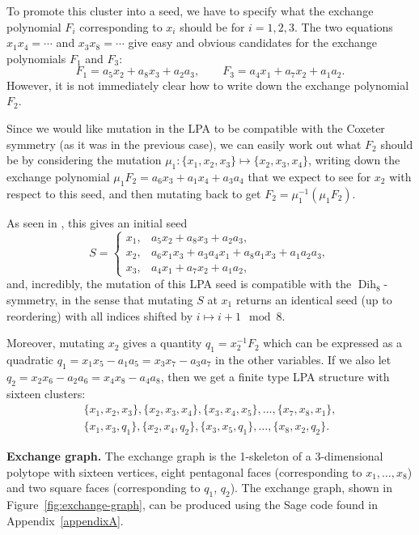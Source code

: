 \documentclass[pdftex]{sigma}
\numberwithin{equation}{section}
\theoremstyle{definition}
\DeclareMathOperator{\Dih}{Dih}
\begin{document}
To promote this cluster into a seed, we have to specify what the exchange polynomial $F_i$ corresponding to $x_i$ should be for $i=1,2,3$. The two equations $x_1x_4=\cdots$ and $x_3x_8=\cdots$ give easy and obvious candidates for the exchange polynomials $F_1$ and $F_3$:
\[ F_1 = a_5x_2 + a_8x_3 + a_2a_3, \qquad F_3 = a_4x_1 + a_7x_2 + a_1a_2. \]
However, it is not immediately clear how to write down the exchange polynomial $F_2$.

Since we would like mutation in the LPA to be compatible with the Coxeter symmetry (as it was in the previous case), we can easily work out what $F_2$ should be by considering the mutation $\mu_1\colon \{x_1,x_2,x_3\}\mapsto \{x_2,x_3,x_4\}$, writing down the exchange polynomial $\mu_1F_2=a_6x_3 + a_1x_4 + a_3a_4$ that we expect to see for $x_2$ with respect to this seed, and then mutating back to get $F_2 = \mu_1^{-1}(\mu_1F_2)$.

As seen in \cite{duc}, this gives an initial seed
\[ S = \begin{cases}
x_1, & a_5x_2 + a_8x_3 + a_2a_3, \\
x_2, & a_6x_1x_3 + a_3a_4x_1 + a_8a_1x_3 + a_1a_2a_3, \\
x_3, & a_4x_1 + a_7x_2 + a_1a_2,
\end{cases} \]
and, incredibly, the mutation of this LPA seed is compatible with the $\Dih_8$-symmetry, in the sense that mutating $S$ at $x_1$ returns an identical seed (up to reordering) with all indices shifted by $i\mapsto i+1\mod 8$.

Moreover, mutating $x_2$ gives a quantity $q_1 = x_2^{-1}F_2$ which can be expressed as a quadratic $q_1 = x_1x_5 - a_1a_5 = x_3x_7 - a_3a_7$ in the other variables. If we also let $q_2 = x_2x_6 - a_2a_6 = x_4x_8 - a_4a_8$, then we get a finite type LPA structure with sixteen clusters:
\begin{gather*} \{x_1,x_2,x_3\}, \{x_2,x_3,x_4\}, \{x_3,x_4,x_5\}, \dots, \{x_7,x_8,x_1\}, \\
 \{x_1,x_3,q_1\}, \{x_2,x_4,q_2\}, \{x_3,x_5,q_1\}, \dots, \{x_8,x_2,q_2\}. \end{gather*}

{\bf Exchange graph.}
The exchange graph is the 1-skeleton of a 3-dimensional polytope with sixteen vertices, eight pentagonal faces (corresponding to $x_1,\ldots,x_8$) and two square faces (corresponding to $q_1$, $q_2$). The exchange graph, shown in Figure~\ref{fig:exchange-graph}, can be produced using the Sage code found in Appendix~\ref{appendixA}.
\end{document}
